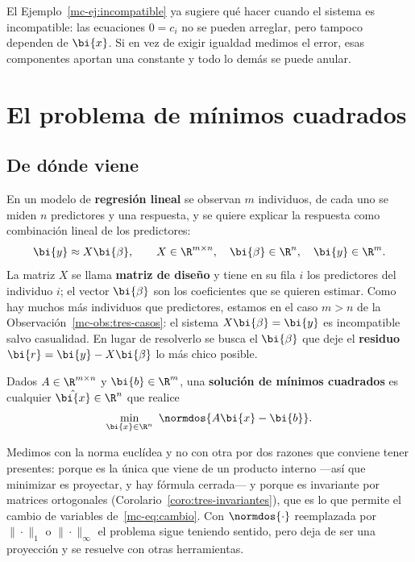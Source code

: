 El Ejemplo~\ref{mc-ej:incompatible} ya sugiere qué hacer cuando el sistema es
incompatible: las ecuaciones $0=c_i$ no se pueden arreglar, pero tampoco
dependen de $\bi{x}$. Si en vez de exigir igualdad medimos el error, esas
componentes aportan una constante y todo lo demás se puede anular.

\section{El problema de mínimos cuadrados}\label{mc-sec:mc}

\subsection{De dónde viene}\label{mc-sec:regresion-motiv}

En un modelo de \textbf{regresión lineal} se observan $m$ individuos, de cada
uno se miden $n$ predictores y una respuesta, y se quiere explicar la
respuesta como combinación lineal de los predictores:
\[
\bi{y}\approx X\bi{\beta},\qquad X\in\R^{m\times n},\quad
\bi{\beta}\in\R^n,\quad \bi{y}\in\R^m .
\]
La matriz $X$ se llama \textbf{matriz de diseño} y tiene en su fila $i$ los
predictores del individuo $i$; el vector $\bi{\beta}$ son los coeficientes que
se quieren estimar. Como hay muchos más individuos que predictores, estamos en
el caso $m>n$ de la Observación~\ref{mc-obs:tres-casos}: el sistema
$X\bi{\beta}=\bi{y}$ es incompatible salvo casualidad. En lugar de resolverlo
se busca el $\bi{\beta}$ que deje el \textbf{residuo}
$\bi{r}=\bi{y}-X\bi{\beta}$ lo más chico posible.

\begin{definition}\label{mc-def:mc}
Dados $A\in\R^{m\times n}$ y $\bi{b}\in\R^m$, una \textbf{solución de mínimos
cuadrados} es cualquier $\hat{\bi{x}}\in\R^n$ que realice
\[
\min_{\bi{x}\in\R^n}\ \normdos{A\bi{x}-\bi{b}} .
\]
\end{definition}

Medimos con la norma euclídea y no con otra por dos razones que conviene tener
presentes: porque es la única que viene de un producto interno
---así que minimizar es proyectar, y hay fórmula cerrada--- y porque es
invariante por matrices ortogonales (Corolario~\ref{coro:tres-invariantes}),
que es lo que permite el cambio de variables de~\eqref{mc-eq:cambio}. Con
$\normdos{\cdot}$ reemplazada por $\|\cdot\|_1$ o $\|\cdot\|_\infty$ el
problema sigue teniendo sentido, pero deja de ser una proyección y se resuelve
con otras herramientas.

